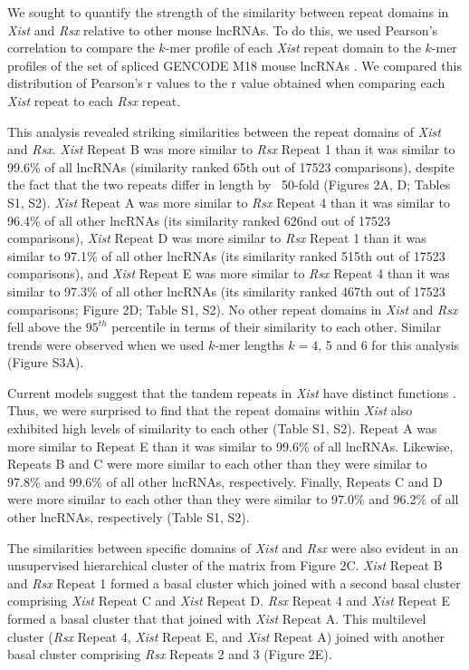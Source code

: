 We sought to quantify the strength of the similarity between repeat domains in \emph{Xist} and \emph{Rsx} relative to other mouse lncRNAs. To do this, we used Pearson’s correlation to compare the $k$-mer profile of each \emph{Xist} repeat domain to the $k$-mer profiles of the set of spliced GENCODE M18 mouse lncRNAs \cite{Derrien2012TheExpression}. We compared this distribution of Pearson’s r values to the r value obtained when comparing each \emph{Xist} repeat to each \emph{Rsx} repeat. 

This analysis revealed striking similarities between the repeat domains of \emph{Xist} and \emph{Rsx}. \emph{Xist} Repeat B was more similar to \emph{Rsx} Repeat 1 than it was similar to 99.6\% of all lncRNAs (similarity ranked 65th out of 17523 comparisons), despite the fact that the two repeats differ in length by ~50-fold (Figures 2A, D; Tables S1, S2). \emph{Xist} Repeat A was more similar to \emph{Rsx} Repeat 4 than it was similar to 96.4\% of all other lncRNAs (its similarity ranked 626nd out of 17523 comparisons), \emph{Xist} Repeat D was more similar to \emph{Rsx} Repeat 1 than it was similar to 97.1\% of all other lncRNAs (its similarity ranked 515th out of 17523 comparisons), and \emph{Xist} Repeat E was more similar to \emph{Rsx} Repeat 4 than it was similar to 97.3\% of all other lncRNAs (its similarity ranked 467th out of 17523 comparisons; Figure 2D; Table S1, S2). No other repeat domains in \emph{Xist} and \emph{Rsx} fell above the $95^{th}$ percentile in terms of their similarity to each other. Similar trends were observed when we used $k$-mer lengths $k = 4$, 5 and 6 for this analysis (Figure S3A). 

Current models suggest that the tandem repeats in \emph{Xist} have distinct functions \cite{Balaton2018TheChromosome,Brockdorff2018LocalNcRNA,DaRocha2017NovelConformation,Sahakyan2018TheCompensation}. Thus, we were surprised to find that the repeat domains within \emph{Xist} also exhibited high levels of similarity to each other (Table S1, S2). Repeat A was more similar to Repeat E than it was similar to 99.6\% of all lncRNAs. Likewise, Repeats B and C were more similar to each other than they were similar to 97.8\% and 99.6\% of all other lncRNAs, respectively. Finally, Repeats C and D were more similar to each other than they were similar to 97.0\% and 96.2\% of all other lncRNAs, respectively (Table S1, S2). 

The similarities between specific domains of \emph{Xist} and \emph{Rsx} were also evident in an unsupervised hierarchical cluster of the matrix from Figure 2C. \emph{Xist} Repeat B and \emph{Rsx} Repeat 1 formed a basal cluster which joined with a second basal cluster comprising \emph{Xist} Repeat C and \emph{Xist} Repeat D.   \emph{Rsx} Repeat 4 and \emph{Xist} Repeat E formed a basal cluster that that joined with \emph{Xist} Repeat A. This multilevel cluster (\emph{Rsx} Repeat 4, \emph{Xist} Repeat E, and \emph{Xist} Repeat A) joined with another basal cluster comprising \emph{Rsx} Repeats 2 and 3 (Figure 2E). 

